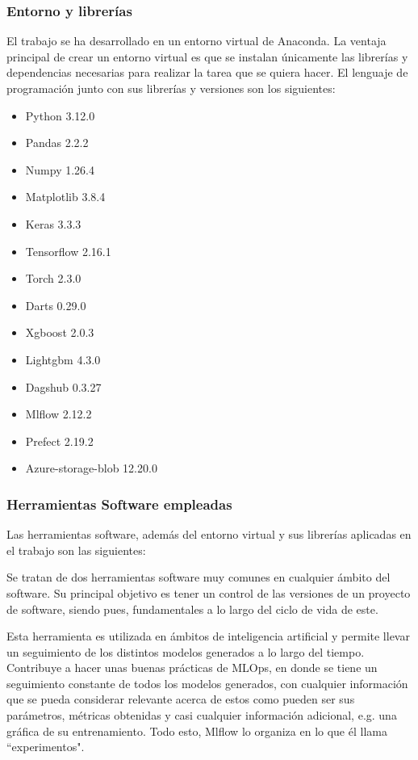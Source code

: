 \subsubsection{Entorno y librerías}
El trabajo se ha desarrollado en un entorno virtual de Anaconda. La ventaja principal de crear un entorno virtual es que se instalan únicamente las librerías y dependencias necesarias para realizar la tarea que se quiera hacer. El lenguaje de programación junto con sus librerías y versiones son los siguientes:
\begin{itemize}
    \item Python 3.12.0
    \item Pandas 2.2.2
    \item Numpy 1.26.4
    \item Matplotlib 3.8.4
    \item Keras 3.3.3
    \item Tensorflow 2.16.1
    \item Torch 2.3.0
    \item Darts 0.29.0
    \item Xgboost 2.0.3
    \item Lightgbm 4.3.0
    \item Dagshub 0.3.27
    \item Mlflow 2.12.2
    \item Prefect 2.19.2
    \item Azure-storage-blob 12.20.0
\end{itemize}

\subsubsection{Herramientas Software empleadas}
Las herramientas software, además del entorno virtual y sus librerías aplicadas en el trabajo son las siguientes:

Se tratan de dos herramientas software muy comunes en cualquier ámbito del software. Su principal objetivo es tener un control de las versiones de un proyecto de software, siendo pues, fundamentales a lo largo del ciclo de vida de este.

Esta herramienta es utilizada en ámbitos de inteligencia artificial y permite llevar un seguimiento de los distintos modelos generados a lo largo del tiempo. Contribuye a hacer unas buenas prácticas de MLOps, en donde se tiene un seguimiento constante de todos los modelos generados, con cualquier información que se pueda considerar relevante acerca de estos como pueden ser sus parámetros, métricas obtenidas y casi cualquier información adicional, e.g. una gráfica de su entrenamiento. Todo esto, Mlflow lo organiza en lo que él llama ``experimentos".


